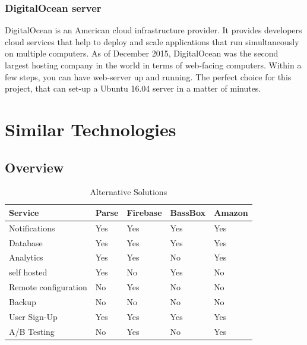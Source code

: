 \subsubsection{DigitalOcean server}

DigitalOcean is an American cloud infrastructure provider. It provides developers cloud services that help to deploy and scale applications that run simultaneously on multiple computers. As of December 2015, DigitalOcean was the second largest hosting company in the world in terms of web-facing computers. Within a few steps, you can have web-server up and running. The perfect choice for this project, that can set-up a Ubuntu 16.04 server in a matter of minutes. 



\section{Similar Technologies}

\subsection{Overview}

\begin{table}[h]
\centering
\caption{Alternative Solutions}
\label{fig:overview}
\begin{tabular}{|l|l|l|l|l|}
\hline
\cellcolor{green!20}Service &\cellcolor{green!20}Parse &\cellcolor{green!20}Firebase &\cellcolor{green!20}BassBox &\cellcolor{green!20}Amazon \\ \hline
Notifications               & Yes                      & Yes                         & Yes                        & Yes\\ \hline
Database                    & Yes                      & Yes                         & Yes                        & Yes\\ \hline
Analytics                   & Yes                      & Yes                         & No                         & Yes\\ \hline
self hosted                 & Yes                      & No                          & Yes                        & No \\ \hline
Remote configuration        & No                       & Yes                         & No                         & No \\ \hline
Backup                      & No                       & No                          & No                         & No \\ \hline
User Sign-Up                & Yes                      & Yes                         & Yes                        & Yes\\ \hline
A/B Testing                 & No                       & Yes                         & No                         & Yes\\ \hline
\end{tabular}
\end{table}


